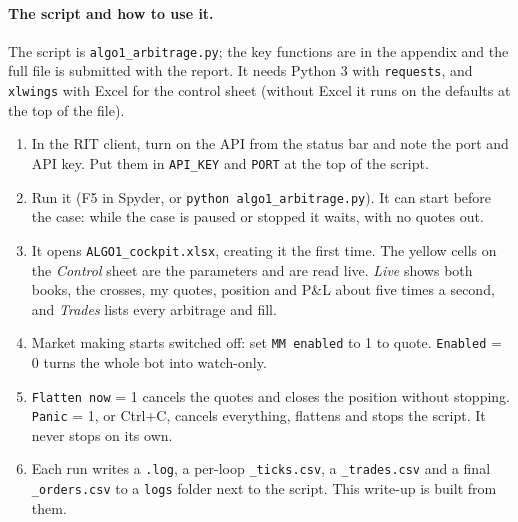 \paragraph{The script and how to use it.} The script is
\texttt{algo1\_arbitrage.py}; the key functions are in the appendix and the full file
is submitted with the report. It needs Python 3 with \texttt{requests}, and
\texttt{xlwings} with Excel for the control sheet (without Excel it runs on the
defaults at the top of the file).
\begin{enumerate}
  \item In the RIT client, turn on the API from the status bar and note the port and
        API key. Put them in \texttt{API\_KEY} and \texttt{PORT} at the top of the
        script.
  \item Run it (F5 in Spyder, or \texttt{python algo1\_arbitrage.py}). It can start
        before the case: while the case is paused or stopped it waits, with no
        quotes out.
  \item It opens \texttt{ALGO1\_cockpit.xlsx}, creating it the first time. The yellow
        cells on the \emph{Control} sheet are the parameters and are read live.
        \emph{Live} shows both books, the crosses, my quotes, position and P\&L about
        five times a second, and \emph{Trades} lists every arbitrage and fill.
  \item Market making starts switched off: set \texttt{MM enabled} to 1 to quote.
        \texttt{Enabled} = 0 turns the whole bot into watch-only.
  \item \texttt{Flatten now} = 1 cancels the quotes and closes the position without
        stopping. \texttt{Panic} = 1, or Ctrl+C, cancels everything, flattens and
        stops the script. It never stops on its own.
  \item Each run writes a \texttt{.log}, a per-loop \texttt{\_ticks.csv}, a
        \texttt{\_trades.csv} and a final \texttt{\_orders.csv} to a \texttt{logs}
        folder next to the script. This write-up is built from them.
\end{enumerate}
